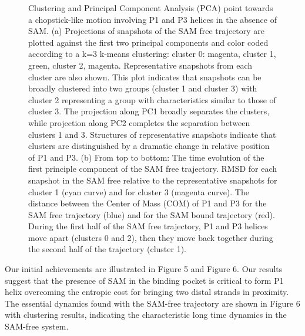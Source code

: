 \documentclass[a4paper,10pt]{article}
\begin{document}
\begin{figure}
\begin{center}
    \end{center} \caption{Clustering and Principal Component Analysis (PCA) point towards a chopstick-like motion involving P1 and P3 helices in the absence of SAM.  (a) Projections of snapshots of the SAM free trajectory are plotted against the first two principal components and color coded according to a k=3 k-means clustering: cluster 0: magenta, cluster 1, green, cluster 2, magenta. Representative snapshots from each cluster are also shown. This plot indicates that snapshots can be broadly clustered into two groups (cluster 1 and cluster 3) with cluster 2 representing a group with characteristics similar to those of cluster 3. The projection along PC1 broadly separates the clusters, while projection along PC2 completes the separation between clusters 1 and 3. Structures of representative snapshots indicate that clusters are distinguished by a dramatic change in relative position of P1 and P3. (b) From top to bottom: The time evolution of the first principle component of the SAM free trajectory. RMSD for each snapshot in the SAM free relative to the representative snapshots for cluster 1 (cyan curve) and for cluster 3 (magenta curve). The distance between the Center of Mass (COM) of P1 and P3 for the SAM free trajectory (blue) and for the SAM bound trajectory (red).  During the first half of the SAM free trajectory, P1 and P3 helices move apart (clusters 0 and 2), then they move back together during the second half of the trajectory (cluster 1).}

\end{figure}

Our initial achievements are illustrated in Figure 5 and Figure 6.  Our results suggest that the presence of SAM in the binding pocket is critical to form P1 helix overcoming the entropic cost for bringing two distal strands in proximity.  The essential dynamics found with the SAM-free trajectory are shown in Figure 6 with clustering results, indicating the characteristic long time dynamics in the SAM-free system. 
\end{document}
